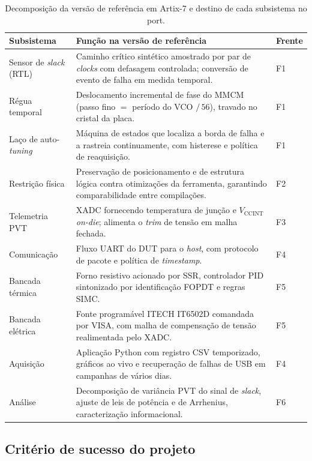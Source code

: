 \documentclass[11pt,a4paper]{article}
\begin{document}
\begin{table}[htbp]
\centering
\caption{Decomposição da versão de referência em Artix-7 e destino de cada subsistema no port.}
\label{tab:subsistemas}
\small
\begin{tabularx}{\textwidth}{@{}L{3.3cm} X L{2.6cm}@{}}
\toprule
\textbf{Subsistema} & \textbf{Função na versão de referência} & \textbf{Frente} \\
\midrule
Sensor de \emph{slack} (RTL) &
Caminho crítico sintético amostrado por par de \emph{clocks} com defasagem
controlada; conversão de evento de falha em medida temporal. & F1 \\
Régua temporal &
Deslocamento incremental de fase do MMCM (passo fino $=$ período do VCO $/\,56$),
travado no cristal da placa. & F1 \\
Laço de auto-\emph{tuning} &
Máquina de estados que localiza a borda de falha e a rastreia continuamente,
com histerese e política de reaquisição. & F1 \\
Restrição física &
Preservação de posicionamento e de estrutura lógica contra otimizações da
ferramenta, garantindo comparabilidade entre compilações. & F2 \\
Telemetria PVT &
XADC fornecendo temperatura de junção e $V_\text{CCINT}$ \emph{on-die};
alimenta o \emph{trim} de tensão em malha fechada. & F3 \\
Comunicação &
Fluxo UART do DUT para o \emph{host}, com protocolo de pacote e política
de \emph{timestamp}. & F4 \\
Bancada térmica &
Forno resistivo acionado por SSR, controlador PID sintonizado por
identificação FOPDT e regras SIMC. & F5 \\
Bancada elétrica &
Fonte programável ITECH IT6502D comandada por VISA, com malha de compensação
de tensão realimentada pelo XADC. & F5 \\
Aquisição &
Aplicação Python com registro CSV temporizado, gráficos ao vivo e recuperação
de falhas de USB em campanhas de vários dias. & F4 \\
Análise &
Decomposição de variância PVT do sinal de \emph{slack}, ajuste de leis de
potência e de Arrhenius, caracterização informacional. & F6 \\
\bottomrule
\end{tabularx}
\end{table}

\subsection{Critério de sucesso do projeto}
\end{document}
